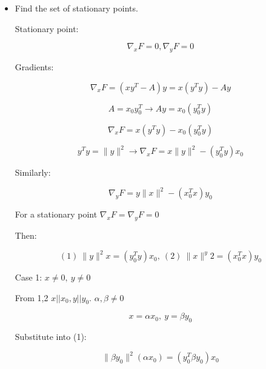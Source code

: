\documentclass[11pt,letterpaper]{article}
\begin{document}
\begin{enumerate}
\begin{itemize}
	\[ F(x,y) = 1/2 \|A - xy^T \|^2_F \]   

	\[ A = x_0 y_0^T \neq 0 \]   

	Two points:

	\[ (x_1, y_1) = (x_0, y_0), \ 
	(x_2, y_x) = (-x_0, -y_0) \]   

	First point:

	\[ x_1 y_1^T = x_0 y_0^T = A \]   

	\[ F(x_1, y_1) = 1/2 \|A - A \|^2_F = 0 \]

	Second Point:

	\[ x_2 y_2^T = (-x_0) (-y_0)^T = A \]   

	\[ F(x_2, y_2) = 1/2 \|A - A \|^2_F = 0 \]

	Midpoint: $(x_{mid}, x_{mid}) = (0,0)$

	\[ x_{mid} \ y_{mid}^T = 0 \]   

	\[ F(x_{mid}, y_{mid}) = 1/2 \|A - 0 \|^2_F =
	1/2 \|A\|^2_F > 0 \ (As \ A \neq 0)\]

	This contradicts convexivity

	\item Find the set of stationary points.
	
	Stationary point:

	\[ \nabla_x F = 0, \nabla_y F = 0 \]

	Gradients:

	\[ \nabla_x F = (xy^T - A)y =
	x(y^Ty) - Ay \]

	\[ A = x_0 y_0^T \rightarrow 
	A y = x_0(y_0^T y) \]

	\[ \nabla_x F = x(y^Ty) - x_0(y_0^T y)\]   

	\[ y^Ty = \|y\|^2 \rightarrow 
	\nabla_x F = x \|y\|^2 - (y_0^T y)x_0 \]   

	Similarly:

	\[ \nabla_y F =
	y \|x\|^2 - (x_0^T x)y_0 \]   

	For a stationary point 
	$ \nabla_x F = \nabla_y F = 0 $

	Then:

	\[ (1) \ \|y\|^2 x = (y_0^T y)x_0, \ 
	(2) \ \|x\|^ y2 = (x_0^T x)y_0 \]   

	Case 1: $ x \neq 0, \ y \neq 0$

	From 1,2 $x||x_0, y||y_0$. 
	$\alpha,\beta \neq 0$

	\[ x = \alpha x_0, \ y = \beta y_0 \]

	Substitute into (1):

	\[ \| \beta y_0 \|^2 (\alpha x_0) =
	(y_0^T \beta y_0) x_0 \]


\end{itemize}
\end{enumerate}
\end{document}

